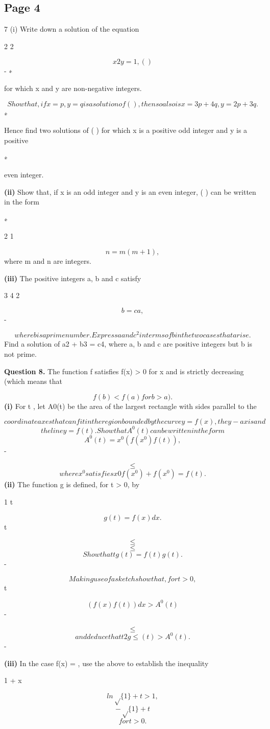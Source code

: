 \documentclass[12pt]{article}
\begin{document}
\subsection*{Page 4}
\begin{flushleft}
7 (i) Write down a solution of the equation\par
2 2\par
\[x 2y = 1 , ( )\]
- ∗\par
for which x and y are non-negative integers.\par
\[Show that, if x = p, y = q is a solution of ( ), then so also is x = 3p + 4q, y = 2p + 3q.\]
∗\par
Hence find two solutions of ( ) for which x is a positive odd integer and y is a positive\par
∗\par
even integer.\par
\textbf{(ii)} Show that, if x is an odd integer and y is an even integer, ( ) can be written in the form\par
∗\par
2 1\par
\[n = m(m + 1) ,\]
where m and n are integers.\par
\textbf{(iii)} The positive integers a, b and c satisfy\par
3 4 2\par
\[b = c a ,\]
-\par
\[where b is a prime number. Express a and c^2 in terms of b in the two cases that arise.\]
Find a solution of a2 + b3 = c4, where a, b and c are positive integers but b is not prime.\par
\bigskip\textbf{Question 8.} The function f satisfies f(x) > 0 for x  and is strictly decreasing (which means that\par
\[f(b) < f(a) for b > a).\]
\textbf{(i)} For t , let A0(t) be the area of the largest rectangle with sides parallel to the\par
\[coordinate axes that can fit in the region bounded by the curve y = f(x), the y-axis and\]
\[the line y = f(t). Show that A^0(t) can be written in the form\]
\[A^0(t) = x^0 (f(x^0) f(t)) ,\]
-\par
\[\leq\]
\[where x^0 satisfies x0f (x^0) + f(x^0) = f(t) .\]
\textbf{(ii)} The function g is defined, for t > 0, by\par
1 t\par
\[g(t) = f(x)dx .\]
t\par
\[\leq\]
\[\leq\]
\[Show that tg (t) = f(t) g(t) .\]
-\par
\[Making use of a sketch show that, for t > 0,\]
t\par
\[(f(x) f(t)) dx > A^0(t)\]
-\par
\[\leq\]
\[and deduce that t2g \leq (t) > A^0(t).\]
-\par
\textbf{(iii)} In the case f(x) = , use the above to establish the inequality\par
1 + x\par
\[ln \sqrt\{1\} + t > 1 ,\]
\[- \sqrt\{1\} + t\]
\[for t > 0.\]
\end{flushleft}
\end{document}

